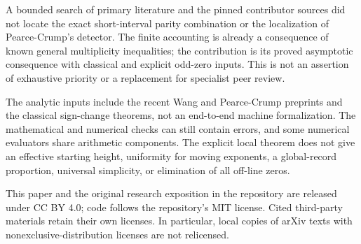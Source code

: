 \documentclass[11pt]{article}
\theoremstyle{remark}
\begin{document}
A bounded search of primary literature and the pinned contributor sources
did not locate the exact short-interval parity combination or the localization
of Pearce-Crump's detector. The finite accounting is already a consequence
of known general multiplicity inequalities; the contribution is its proved
asymptotic consequence with classical and explicit odd-zero inputs. This is
not an assertion of exhaustive priority or a replacement for specialist peer
review.

The analytic inputs include the recent Wang and Pearce-Crump preprints and
the classical sign-change theorems, not an end-to-end machine formalization.
The mathematical and numerical checks can still contain errors, and some
numerical evaluators share arithmetic components. The explicit local theorem
does not give an effective starting height, uniformity for moving exponents,
a global-record proportion, universal simplicity, or elimination of all
off-line zeros.

This paper and the original research exposition in the repository are
released under CC BY 4.0; code follows the repository's MIT license.
Cited third-party materials retain their own licenses. In particular,
local copies of arXiv texts with nonexclusive-distribution licenses are
not relicensed.
\end{document}
